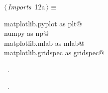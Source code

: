 \documentclass[12pt]{report}
\begin{document}
\begin{flushleft} \small
\begin{minipage}{\linewidth}\label{scrap2}\raggedright\small
{} $\langle\,${\itshape Imports}\nobreak\ {\footnotesize {12a}}$\,\rangle\equiv$
\vspace{-1ex}
\begin{list}{}{} \item
\mbox{}\verb@import matplotlib.pyplot as plt@\\
\mbox{}\verb@import numpy as np@\\
\mbox{}\verb@import matplotlib.mlab as mlab@\\
\mbox{}\verb@import matplotlib.gridspec as gridspec@\\
\mbox{}\verb@@{\NWsep}
\end{list}
\vspace{-1.5ex}
\footnotesize
\begin{list}{}{\setlength{\itemsep}{-\parsep}\setlength{\itemindent}{-\leftmargin}}
\item \NWtxtMacroDefBy\ .
\item \NWtxtMacroRefIn\ .

\item{}
\end{list}
\end{minipage}\vspace{4ex}
\end{flushleft}
\newchunk \blindtext
\end{document}
